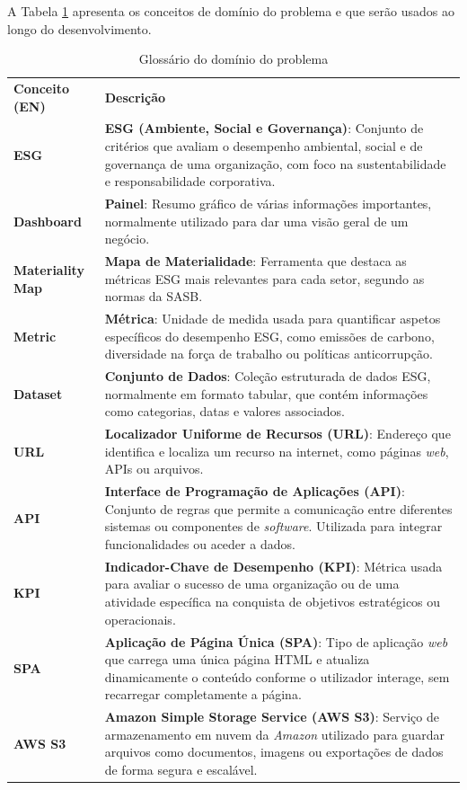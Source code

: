 A Tabela \ref{tab:glossario_dominio} apresenta os conceitos de domínio do problema e que serão usados ao longo do desenvolvimento.

\begin{table}[H]
    \renewcommand{\arraystretch}{1.2}
    \setlength{\tabcolsep}{10pt}
    \centering
    \begin{tabular}{>{\bfseries}p{4cm} p{11cm}}
        \rowcolor{purple!40}
        \textbf{Conceito (EN)} & \textbf{Descrição} \\
        ESG & \textbf{ESG (Ambiente, Social e Governança)}: Conjunto de critérios que avaliam o desempenho ambiental, social e de governança de uma organização, com foco na sustentabilidade e responsabilidade corporativa. \\
        Dashboard & \textbf{Painel}: Resumo gráfico de várias informações importantes, normalmente utilizado para dar uma visão geral de um negócio. \\
        Materiality Map & \textbf{Mapa de Materialidade}: Ferramenta que destaca as métricas ESG mais relevantes para cada setor, segundo as normas da SASB. \\
        Metric & \textbf{Métrica}: Unidade de medida usada para quantificar aspetos específicos do desempenho ESG, como emissões de carbono, diversidade na força de trabalho ou políticas anticorrupção. \\
        Dataset & \textbf{Conjunto de Dados}: Coleção estruturada de dados ESG, normalmente em formato tabular, que contém informações como categorias, datas e valores associados. \\
        URL & \textbf{Localizador Uniforme de Recursos (URL)}: Endereço que identifica e localiza um recurso na internet, como páginas \textit{web}, APIs ou arquivos. \\
        API & \textbf{Interface de Programação de Aplicações (API)}: Conjunto de regras que permite a comunicação entre diferentes sistemas ou componentes de \textit{software}. Utilizada para integrar funcionalidades ou aceder a dados. \\
        KPI & \textbf{Indicador-Chave de Desempenho (KPI)}: Métrica usada para avaliar o sucesso de uma organização ou de uma atividade específica na conquista de objetivos estratégicos ou operacionais. \\
        SPA & \textbf{Aplicação de Página Única (SPA)}: Tipo de aplicação \textit{web} que carrega uma única página HTML e atualiza dinamicamente o conteúdo conforme o utilizador interage, sem recarregar completamente a página. \\
        AWS S3 & \textbf{Amazon Simple Storage Service (AWS S3)}: Serviço de armazenamento em nuvem da \textit{Amazon} utilizado para guardar arquivos como documentos, imagens ou exportações de dados de forma segura e escalável. \\
    \end{tabular}
    \caption{Glossário do domínio do problema}
    \label{tab:glossario_dominio}
\end{table}

